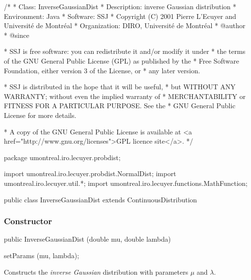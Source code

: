 \begin{code}
\begin{hide}
/*
 * Class:        InverseGaussianDist
 * Description:  inverse Gaussian distribution
 * Environment:  Java
 * Software:     SSJ 
 * Copyright (C) 2001  Pierre L'Ecuyer and Université de Montréal
 * Organization: DIRO, Université de Montréal
 * @author       
 * @since

 * SSJ is free software: you can redistribute it and/or modify it under
 * the terms of the GNU General Public License (GPL) as published by the
 * Free Software Foundation, either version 3 of the License, or
 * any later version.

 * SSJ is distributed in the hope that it will be useful,
 * but WITHOUT ANY WARRANTY; without even the implied warranty of
 * MERCHANTABILITY or FITNESS FOR A PARTICULAR PURPOSE.  See the
 * GNU General Public License for more details.

 * A copy of the GNU General Public License is available at
   <a href="http://www.gnu.org/licenses">GPL licence site</a>.
 */
\end{hide}
package umontreal.iro.lecuyer.probdist;
\begin{hide}
import umontreal.iro.lecuyer.probdist.NormalDist;
import umontreal.iro.lecuyer.util.*;
import umontreal.iro.lecuyer.functions.MathFunction;
 \end{hide}

public class InverseGaussianDist extends ContinuousDistribution\begin{hide} {
   protected double mu;
   protected double lambda;

   private static class Function implements MathFunction {
      protected double mu;
      protected double lambda;
      protected double u;

      public Function (double mu, double lambda, double u) {
         this.mu = mu;
         this.lambda = lambda;
         this.u = u;
      }

      public double evaluate (double x) {
         return u - cdf(mu, lambda, x);
      }
   }
\end{hide}
\end{code}
\subsubsection* {Constructor}

\begin{code}

   public InverseGaussianDist (double mu, double lambda)\begin{hide} {
      setParams (mu, lambda);
   }\end{hide}
\end{code}
\begin{tabb}
   Constructs the {\em inverse Gaussian\/} distribution with parameters $\mu$ and $\lambda$.
\end{tabb}

